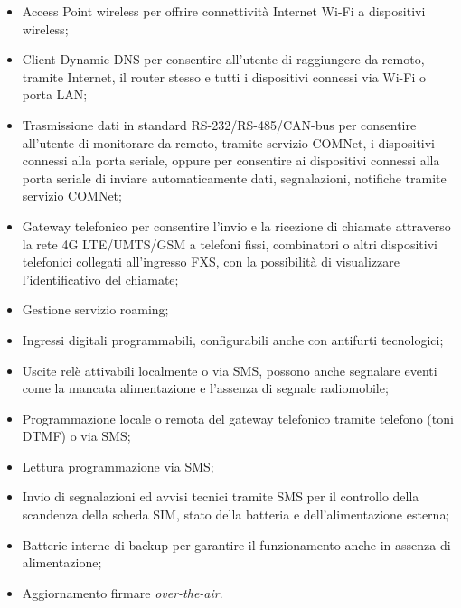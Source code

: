 \begin{itemize}
	\item Access Point wireless per offrire connettività Internet Wi-Fi a dispositivi wireless;
	\item Client Dynamic DNS per consentire all’utente di raggiungere da remoto, tramite Internet, il router stesso e tutti i dispositivi connessi via Wi-Fi o porta LAN;
	\item Trasmissione dati in standard RS-232/RS-485/CAN-bus per consentire all’utente di monitorare da remoto, tramite servizio COMNet, i dispositivi connessi alla porta seriale, oppure per consentire ai dispositivi connessi alla porta seriale di inviare automaticamente dati, segnalazioni, notifiche tramite servizio COMNet;
	\item Gateway telefonico per consentire l’invio e la ricezione di chiamate attraverso la rete 4G LTE/UMTS/GSM a telefoni fissi, combinatori o altri dispositivi telefonici collegati all’ingresso FXS, con la possibilità di visualizzare l'identificativo del chiamate;
	\item Gestione servizio roaming;
	\item Ingressi digitali programmabili, configurabili anche con antifurti tecnologici;
	\item Uscite relè attivabili localmente o via SMS, possono anche segnalare eventi come la mancata alimentazione e l'assenza di segnale radiomobile;
	\item Programmazione locale o remota del gateway telefonico tramite telefono (toni DTMF) o via SMS;
	\item Lettura programmazione via SMS;
	\item Invio di segnalazioni ed avvisi tecnici tramite SMS per il controllo della scandenza della scheda SIM, stato della batteria e dell'alimentazione esterna;
	\item Batterie interne di backup per garantire il funzionamento anche in assenza di alimentazione;
	\item Aggiornamento firmare \textit{over-the-air}.
\end{itemize}

